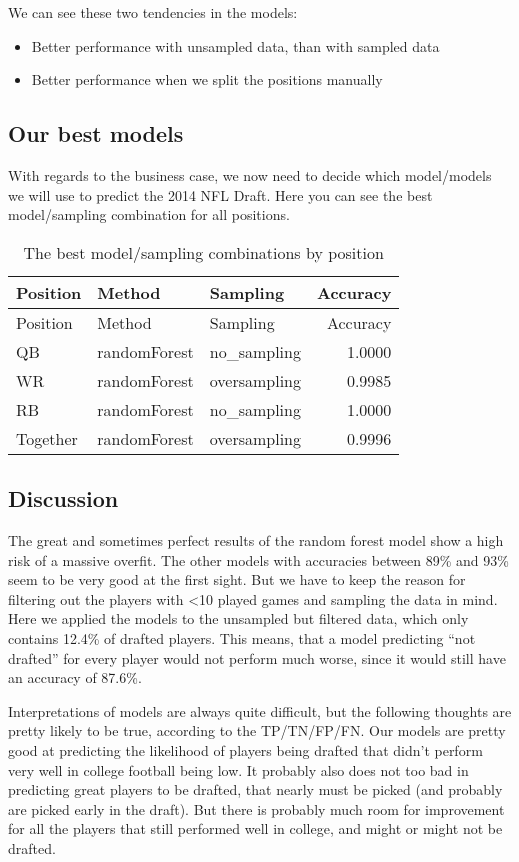 \documentclass[]{article}
\providecommand{\tightlist}{%
  \setlength{\itemsep}{0pt}\setlength{\parskip}{0pt}}
\begin{document}
We can see these two tendencies in the models:

\begin{itemize}
\tightlist
\item
  Better performance with unsampled data, than with sampled data
\item
  Better performance when we split the positions manually
\end{itemize}

\hypertarget{our-best-models}{%
\subsection{Our best models}\label{our-best-models}}

With regards to the business case, we now need to decide which
model/models we will use to predict the 2014 NFL Draft. Here you can see
the best model/sampling combination for all positions.

\begin{longtable}[]{@{}lllr@{}}
\caption{The best model/sampling combinations by
position}\tabularnewline
\toprule
Position & Method & Sampling & Accuracy\tabularnewline
\midrule
\endfirsthead
\toprule
Position & Method & Sampling & Accuracy\tabularnewline
\midrule
\endhead
QB & randomForest & no\_sampling & 1.0000\tabularnewline
WR & randomForest & oversampling & 0.9985\tabularnewline
RB & randomForest & no\_sampling & 1.0000\tabularnewline
Together & randomForest & oversampling & 0.9996\tabularnewline
\bottomrule
\end{longtable}

\hypertarget{discussion}{%
\subsection{Discussion}\label{discussion}}

The great and sometimes perfect results of the random forest model show
a high risk of a massive overfit. The other models with accuracies
between 89\% and 93\% seem to be very good at the first sight. But we
have to keep the reason for filtering out the players with \textless10
played games and sampling the data in mind. Here we applied the models
to the unsampled but filtered data, which only contains 12.4\% of
drafted players. This means, that a model predicting ``not drafted'' for
every player would not perform much worse, since it would still have an
accuracy of 87.6\%.

Interpretations of models are always quite difficult, but the following
thoughts are pretty likely to be true, according to the TP/TN/FP/FN. Our
models are pretty good at predicting the likelihood of players being
drafted that didn't perform very well in college football being low. It
probably also does not too bad in predicting great players to be
drafted, that nearly must be picked (and probably are picked early in
the draft). But there is probably much room for improvement for all the
players that still performed well in college, and might or might not be
drafted.
\end{document}
